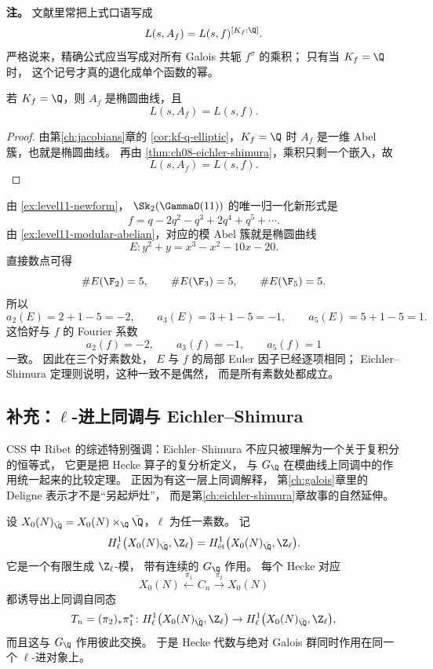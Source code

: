 \textbf{注。}
文献里常把上式口语写成
\[
  L(s,A_f)=L(s,f)^{[K_f:\Q]}.
\]
严格说来，精确公式应当写成对所有 Galois 共轭 $f^\sigma$ 的乘积；
只有当 $K_f=\Q$ 时，
这个记号才真的退化成单个函数的幂。

\begin{corollary}[有理系数情形]
\label{cor:ch08-rational-coefficients}
若 $K_f=\Q$，则 $A_f$ 是椭圆曲线，且
\[
  L(s,A_f)=L(s,f).
\]
\end{corollary}

\begin{proof}
由第\ref{ch:jacobians}章的 \cref{cor:kf-q-elliptic}，$K_f=\Q$ 时 $A_f$ 是一维 Abel 簇，也就是椭圆曲线。
再由 \cref{thm:ch08-eichler-shimura}，乘积只剩一个嵌入，故
\[
  L(s,A_f)=L(s,f).
\]
\end{proof}

\begin{example}[级别 $11$ 的唯一新形式]
\label{ex:ch08-level11}
由 \cref{ex:level11-newform}，
$\Sk_2(\GammaO(11))$ 的唯一归一化新形式是
\[
  f=q-2q^2-q^3+2q^4+q^5+\cdots.
\]
由 \cref{ex:level11-modular-abelian}，对应的模 Abel 簇就是椭圆曲线
\[
  E\colon y^2+y=x^3-x^2-10x-20.
\]
直接数点可得
\[
  \#E(\F_2)=5,
  \qquad
  \#E(\F_3)=5,
  \qquad
  \#E(\F_5)=5.
\]
所以
\[
  a_2(E)=2+1-5=-2,
  \qquad
  a_3(E)=3+1-5=-1,
  \qquad
  a_5(E)=5+1-5=1.
\]
这恰好与 $f$ 的 Fourier 系数
\[
  a_2(f)=-2,
  \qquad a_3(f)=-1,
  \qquad a_5(f)=1
\]
一致。
因此在三个好素数处，
$E$ 与 $f$ 的局部 Euler 因子已经逐项相同；
Eichler--Shimura 定理则说明，这种一致不是偶然，
而是所有素数处都成立。
\end{example}

\subsection*{补充：$\ell$-进上同调与 Eichler--Shimura}
CSS 中 Ribet 的综述特别强调：Eichler--Shimura 不应只被理解为一个关于复积分的恒等式，
它更是把 Hecke 算子的复分析定义，
与 $G_\Q$ 在模曲线上同调中的作用统一起来的比较定理。
正因为有这一层上同调解释，
第\ref{ch:galois}章里的 Deligne 表示才不是“另起炉灶”，
而是第\ref{ch:eichler-shimura}章故事的自然延伸。

\begin{definition}
设 $X_0(N)_{\bar\Q}=X_0(N)\times_{\Q}\bar\Q$，$\ell$ 为任一素数。
记
\[
  H^1_\ell\bigl(X_0(N)_{\bar\Q},\Z_\ell\bigr)
  =H^1_{\text{\'{e}t}}\bigl(X_0(N)_{\bar\Q},\Z_\ell\bigr).
\]
它是一个有限生成 $\Z_\ell$-模，
带有连续的 $G_\Q$ 作用。
每个 Hecke 对应
\[
  X_0(N) \xleftarrow{\pi_1} C_n \xrightarrow{\pi_2} X_0(N)
\]
都诱导出上同调自同态
\[
  T_n=(\pi_2)_*\pi_1^*
  \colon H^1_\ell\bigl(X_0(N)_{\bar\Q},\Z_\ell\bigr)\to H^1_\ell\bigl(X_0(N)_{\bar\Q},\Z_\ell\bigr),
\]
而且这与 $G_\Q$ 作用彼此交换。
于是 Hecke 代数与绝对 Galois 群同时作用在同一个 $\ell$-进对象上。
\end{definition}

